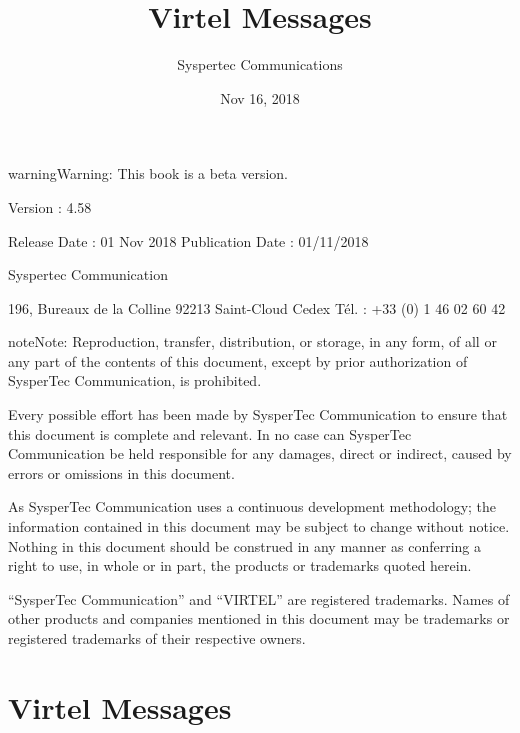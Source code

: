 \documentclass[letterpaper,10pt,english]{sphinxmanual}
\title{Virtel Messages}
\date{Nov 16, 2018}
\author{Syspertec Communications}
\begin{document}
\maketitle
\sphinxtableofcontents
{}\label{\detokenize{messages::doc}}




\begin{sphinxadmonition}{warning}{Warning:}
This book is a beta version.
\end{sphinxadmonition}

Version : 4.58

Release Date : 01 Nov 2018 Publication Date : 01/11/2018

Syspertec Communication

196, Bureaux de la Colline 92213 Saint-Cloud Cedex Tél. : +33 (0) 1 46 02 60 42


\begin{sphinxadmonition}{note}{Note:}
Reproduction, transfer, distribution, or storage, in any form, of all or any part of
the contents of this document, except by prior authorization of SysperTec
Communication, is prohibited.

Every possible effort has been made by SysperTec Communication to ensure that this document
is complete and relevant. In no case can SysperTec Communication be held responsible for
any damages, direct or indirect, caused by errors or omissions in this document.

As SysperTec Communication uses a continuous development methodology; the information
contained in this document may be subject to change without notice. Nothing in this
document should be construed in any manner as conferring a right to use, in whole or in
part, the products or trademarks quoted herein.

“SysperTec Communication” and “VIRTEL” are registered trademarks. Names of other products
and companies mentioned in this document may be trademarks or registered trademarks of
their respective owners.
\end{sphinxadmonition}


\chapter{Virtel Messages}
\label{\detokenize{messages:v458mg-introduction}}\label{\detokenize{messages:virtel-messages}}\label{\detokenize{messages:messages-v4-58}}\label{\detokenize{messages:virtel458mg}}
\end{document}

